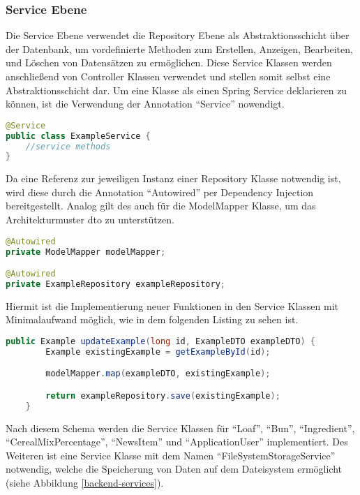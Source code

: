 
\clearpage

\subsubsection{Service Ebene}
Die Service Ebene verwendet die Repository Ebene als Abstraktionsschicht über der Datenbank, um vordefinierte Methoden zum Erstellen, Anzeigen, Bearbeiten, und Löschen von Datensätzen zu ermöglichen. Diese Service Klassen werden anschließend von Controller Klassen verwendet und stellen somit selbst eine Abstraktionsschicht dar.
Um eine Klasse als einen Spring Service deklarieren zu können, ist die Verwendung der Annotation \enquote{Service} nowendigt.
\begin{lstlisting}[language=Java]
@Service
public class ExampleService {
	//service methods
}
\end{lstlisting}

Da eine Referenz zur jeweiligen Instanz einer Repository Klasse notwendig ist, wird diese durch die Annotation \enquote{Autowired} per Dependency Injection bereitgestellt. Analog gilt des auch für die ModelMapper Klasse, um das Architekturmuster \gls{dto} zu unterstützen.
\begin{lstlisting}[language=Java]
@Autowired
private ModelMapper modelMapper;

@Autowired
private ExampleRepository exampleRepository;
\end{lstlisting}

Hiermit ist die Implementierung neuer Funktionen in den Service Klassen mit Minimalaufwand möglich, wie in dem folgenden Listing zu sehen ist.
\begin{lstlisting}[language=Java]
public Example updateExample(long id, ExampleDTO exampleDTO) {
        Example existingExample = getExampleById(id);

        modelMapper.map(exampleDTO, existingExample);

        return exampleRepository.save(existingExample);
    }
\end{lstlisting}

Nach diesem Schema werden die Service Klassen für \enquote{Loaf}, \enquote{Bun}, \enquote{Ingredient}, \enquote{CerealMixPercentage}, \enquote{NewsItem} und \enquote{ApplicationUser} implementiert. Des Weiteren ist eine Service Klasse mit dem Namen \enquote{FileSystemStorageService} notwendig, welche die Speicherung von Daten auf dem Dateisystem ermöglicht (siehe Abbildung \ref{backend-services}). 

